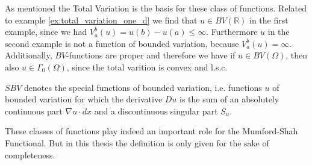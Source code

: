     As mentioned the Total Variation is the basis for these class of functions. Related to example \ref{ex:total_variation_one_d} we find that $u \in BV(\mathbb{R})$ in the first example, since we had $V^{b}_{a}(u) = u(b) - u(a) \le \infty$. Furthermore $u$ in the second example is not a function of bounded variation, because $V^{b}_{a}(u) = \infty$.\\
    Additionally, $BV$-functions are proper and therefore we have if $u \in BV(\Omega)$, then also $u \in \Gamma_{0}(\Omega)$, since the total varition is convex and l.s.c.

    \begin{definition}
        $SBV$ denotes the special functions of bounded variation, i.e. functions $u$ of bounded variation for which the derivative $Du$ is the sum of an absolutely continuous part $\nabla u \cdot dx$ and a discontinuous singular part $S_{u}$.
    \end{definition}

    These classes of functions play indeed an important role for the Mumford-Shah Functional. But in this thesis the definition is only given for the sake of completeness.

